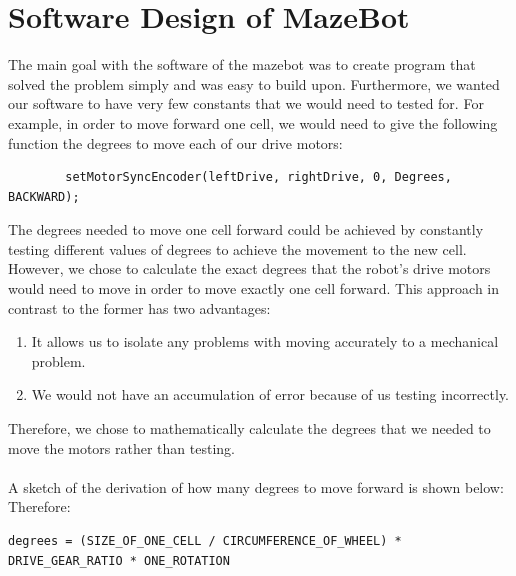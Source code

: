 \documentclass[11pt]{article}
\begin{document}
\section{Software Design of MazeBot}
The main goal with the software of the mazebot was to create program that solved the problem simply and was easy to build upon. Furthermore, we wanted our software to have very few constants that we would need to tested for. For example, in order to move forward one cell, we would need to give the following function the degrees to move each of our drive motors:
\begin{verbatim}
		setMotorSyncEncoder(leftDrive, rightDrive, 0, Degrees, BACKWARD);
\end{verbatim}
The degrees needed to move one cell forward could be achieved by constantly testing different values of degrees to achieve the movement to the new cell. However, we chose to calculate the exact degrees that the robot's drive motors would need to move in order to move exactly one cell forward. This approach in contrast to the former has two advantages: 
\begin{enumerate}
\item It allows us to isolate any problems with moving accurately to a mechanical problem.
\item We would not have an accumulation of error because of us testing incorrectly.
\end{enumerate}
Therefore, we chose to mathematically calculate the degrees that we needed to move the motors rather than testing.\\\\
A sketch of the derivation of how many degrees to move forward is shown below: %
\\
Therefore:
\begin{verbatim}
degrees = (SIZE_OF_ONE_CELL / CIRCUMFERENCE_OF_WHEEL) * DRIVE_GEAR_RATIO * ONE_ROTATION
\end{verbatim}


\newpage

\end{document}
